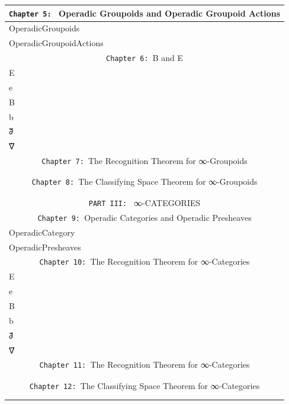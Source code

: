 \documentclass{book}
\theoremstyle{definition}
\begin{document}
{\begin{longtable}{|| l || l ||}
\hline \hline
\multicolumn{2}{||c||}{\texttt{Chapter 5: } Operadic Groupoids and Operadic Groupoid Actions} \\
\hline \hline
OperadicGroupoids & \\
\hline 
OperadicGroupoidActions & \\
\hline \hline
\multicolumn{2}{||c||}{\texttt{Chapter 6: }B⃡ and E⃡} \\
\hline \hline
E⃡ & \\
\hline
e⃡  & \\
\hline
B⃡  & \\
\hline
b⃡  & \\
 \hline
∂⃡  & \\
\hline
∇⃡ & \\
\hline \hline
\multicolumn{2}{||c||}{\texttt{Chapter 7: }The Recognition Theorem for ∞-Groupoids} \\
\hline \hline
 & \\
\hline
 & \\
\multicolumn{2}{||c||}{\texttt{Chapter 8: }The Classifying Space Theorem for ∞-Groupoids} \\
\hline \hline
 & \\
\hline
 & \\
\hline \hline
\multicolumn{2}{||c||}{\texttt{PART III: } ∞-CATEGORIES} \\
\hline \hline
\multicolumn{2}{||c||}{\texttt{Chapter 9: }Operadic Categories and Operadic Presheaves} \\
\hline \hline
OperadicCategory & \\
\hline
OperadicPresheaves & \\
\hline \hline
\multicolumn{2}{||c||}{\texttt{Chapter 10: }The Recognition Theorem for ∞-Categories} \\
\hline \hline
E⃗  & \\ 
\hline
e⃗ & \\
\hline
B⃗ & \\
\hline
b⃗ & \\
 \hline
∂⃗ & \\
\hline
∇⃗ & \\
\hline \hline
\multicolumn{2}{||c||}{\texttt{Chapter 11: }The Recognition Theorem for ∞-Categories} \\
\hline \hline
 & \\
\hline
 & \\
\hline \hline
\multicolumn{2}{||c||}{\texttt{Chapter 12: }The Classifying Space Theorem for ∞-Categories} \\
\hline \hline
 & \\
\hline
 & \\
\hline \hline
\end{longtable}
}
\end{document}
